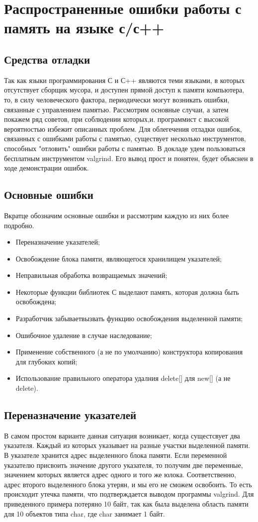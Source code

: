 \documentclass[10pt]{article}
\begin{document}
\section{Распространенные ошибки работы с память на языке с/с++}
\subsection{Средства отладки}
Так как языки программирования С и С++ являются теми языками, в которых отсутствует
сборщик мусора, и доступен прямой доступ к памяти компьютера, то, в силу человеческого
фактора, периодически могут возникать ошибки, связанные с управлением памятью.
Рассмотрим основные случаи, а затем покажем ряд советов, при соблюдении которых,и.
программист с высокой вероятностью избежит описанных проблем.
Для облегечения отладки ошибок, связанных с ошибками работы с памятью, существует несколько инструментов,
способных "отловить" ошибки работы с памятью. В докладе удем пользоваться бесплатным инструментом
valgrind. Его вывод прост и понятен, будет объяснен в ходе демонстрации ошибок.
\subsection{Основные ошибки}
Вкратце обозначим основные ошибки и рассмотрим каждую из них более подробно.
\begin{itemize}
	\item Переназначение указателей;
	\item Освобождение блока памяти, являющегося хранилищем указателей;
	\item Неправильная обработка возвращаемых значений;
	\item Некоторые функции библиотек С выделают память, которая должна быть освобождена;
	\item Разработчик забываетвызвать функцию освобождения выделенной памяти; 
	\item Ошибочное удаление в случае наследование;
	\item Применение собственного (а не по умолчанию) конструктора копирования для глубоких копий;
	\item Использование правильного оператора удалния delete[] для new[] (а не delete).
\end{itemize}

\subsection{Переназначение указателей}
В самом простом варианте данная ситуация возникает, когда сущестсвует два указателя.
Каждый из которых указывает на разные участки выделенной памяти. В указателе хранится
адрес выделенного блока памяти. Если переменной указателю присвоить значение другого
указателя, то получим две переменные, значением которых является адрес одного и того же юлока.
Соответственно, адрес второго выделенного блока утерян, и мы его не сможем освобоить. То есть
происходит утечка памяти, что подтверждается выводом программы valgrind. Для приведенного
примера потеряно 10 байт, так как была выделена область памяти для 10 объектов типа char,
где char занимает 1 байт.
\end{document}
